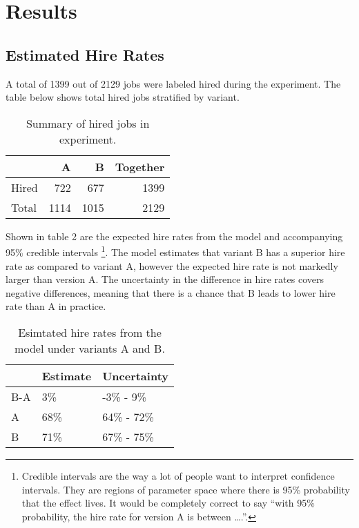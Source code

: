 \documentclass[]{article}
\begin{document}
\hypertarget{results}{%
\section{Results}\label{results}}

\hypertarget{estimated-hire-rates}{%
\subsection{Estimated Hire Rates}\label{estimated-hire-rates}}

A total of 1399 out of 2129 jobs were labeled hired during the
experiment. The table below shows total hired jobs stratified by
variant.

\begin{table}[!h]

\caption{\label{tab:unnamed-chunk-2}Summary of hired jobs in experiment.}
\centering
\begin{tabular}[t]{lrrr}
\toprule
 & A & B & Together\\
\midrule
\rowcolor{gray!6}  Hired & 722 & 677 & 1399\\
Total & 1114 & 1015 & 2129\\
\bottomrule
\end{tabular}
\end{table}

Shown in table 2 are the expected hire rates from the model and
accompanying 95\% credible intervals \footnote{Credible intervals are
  the way a lot of people want to interpret confidence intervals. They
  are regions of parameter space where there is 95\% probability that
  the effect lives. It would be completely correct to say ``with 95\%
  probability, the hire rate for version A is between \ldots{}.''.}. The
model estimates that variant B has a superior hire rate as compared to
variant A, however the expected hire rate is not markedly larger than
version A. The uncertainty in the difference in hire rates covers
negative differences, meaning that there is a chance that B leads to
lower hire rate than A in practice.

\begin{table}[!h]

\caption{\label{tab:unnamed-chunk-3}Esimtated hire rates from the model under variants A and B.}
\centering
\begin{tabular}[t]{lll}
\toprule
 & Estimate & Uncertainty\\
\midrule
\rowcolor{gray!6}  B-A & 3\% & -3\% - 9\%\\
A & 68\% & 64\% - 72\%\\
\rowcolor{gray!6}  B & 71\% & 67\% - 75\%\\
\bottomrule
\end{tabular}
\end{table}
\end{document}

